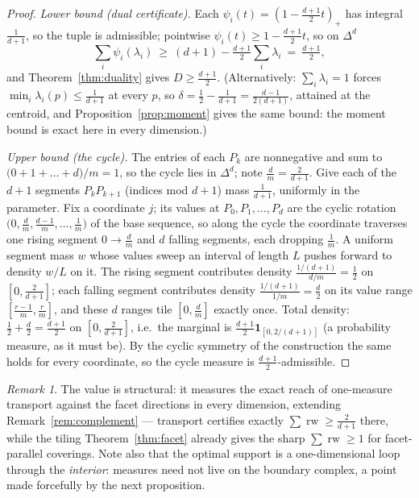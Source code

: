 \documentclass[11pt,reqno]{amsart}
\theoremstyle{plain}
\theoremstyle{definition}
\theoremstyle{remark}
\newtheorem{remark}[theorem]{Remark}
\newcommand{\rw}{\operatorname{rw}}
\begin{document}
\begin{proof}
\emph{Lower bound (dual certificate).} Each $\psi_i(t)=(1-\tfrac{d+1}2t)_+$
has integral $\tfrac1{d+1}$, so the tuple is admissible; pointwise
$\psi_i(t)\ge1-\tfrac{d+1}2t$, so on $\Delta^d$
\[
\textstyle\sum_i\psi_i(\lambda_i)\ \ge\ (d+1)-\tfrac{d+1}2\sum_i\lambda_i
\ =\ \tfrac{d+1}2 ,
\]
and Theorem~\ref{thm:duality} gives $D\ge\tfrac{d+1}2$. (Alternatively:
$\sum_i\lambda_i=1$ forces $\min_i\lambda_i(p)\le\tfrac1{d+1}$ at every $p$,
so $\delta=\tfrac12-\tfrac1{d+1}=\tfrac{d-1}{2(d+1)}$, attained at the
centroid, and Proposition~\ref{prop:moment} gives the same bound: the moment
bound is exact here in every dimension.)

\emph{Upper bound (the cycle).} The entries of each $P_k$ are nonnegative and
sum to $\bigl(0+1+\dots+d\bigr)/m=1$, so the cycle lies in $\Delta^d$; note
$\tfrac dm=\tfrac2{d+1}$. Give each of the $d+1$ segments $P_kP_{k+1}$
(indices mod $d+1$) mass $\tfrac1{d+1}$, uniformly in the parameter. Fix a
coordinate $j$; its values at $P_0,P_1,\dots,P_d$ are the cyclic rotation
$\bigl(0,\tfrac dm,\tfrac{d-1}m,\dots,\tfrac1m\bigr)$ of the base sequence,
so along the cycle the coordinate traverses one rising segment
$0\to\tfrac dm$ and $d$ falling segments, each dropping $\tfrac1m$. A uniform
segment mass $w$ whose values sweep an interval of length $L$ pushes forward
to density $w/L$ on it. The rising segment contributes density
$\frac{1/(d+1)}{d/m}=\tfrac12$ on $[0,\tfrac2{d+1}]$; each falling segment
contributes density $\frac{1/(d+1)}{1/m}=\tfrac d2$ on its value range
$[\tfrac{r-1}m,\tfrac rm]$, and these $d$ ranges tile $[0,\tfrac dm]$ exactly
once. Total density: $\tfrac12+\tfrac d2=\tfrac{d+1}2$ on
$[0,\tfrac2{d+1}]$, i.e.\ the marginal is
$\tfrac{d+1}2\mathbf1_{[0,2/(d+1)]}$ (a probability measure, as it must be).
By the cyclic symmetry of the construction the same holds for every
coordinate, so the cycle measure is $\tfrac{d+1}2$-admissible.
\end{proof}

\begin{remark}
The value is structural: it measures the exact reach of one-measure transport
against the facet directions in every dimension, extending
Remark~\ref{rem:complement} --- transport certifies exactly
$\sum\rw\ge\tfrac2{d+1}$ there, while the tiling Theorem~\ref{thm:facet}
already gives the sharp $\sum\rw\ge1$ for facet-parallel coverings. Note also
that the optimal support is a one-dimensional loop through the
\emph{interior}: measures need not live on the boundary complex, a point made
forcefully by the next proposition.
\end{remark}
\end{document}
